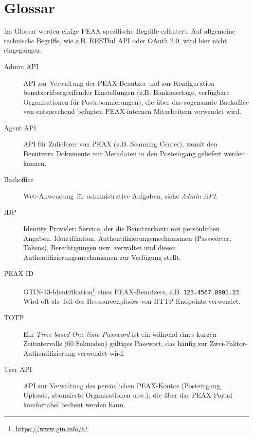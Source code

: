 \section*{Glossar}

Im Glossar werden einige PEAX-spezifische Begriffe erläutert. Auf allgemeine technische Begriffe, wie z.B. RESTful API oder OAuth 2.0, wird hier nicht eingegangen.

\begin{description}
    \item[Admin API] API zur Verwaltung der PEAX-Benutzer und zur Konfiguration benutzerübergreifender Einstellungen (z.B. Bankfeiertage, verfügbare Organisationen für Postabonnierungen), die über das sogenannte Backoffice von entsprechend befugten PEAX-internen Mitarbeitern verwendet wird.
    \item[Agent API] API für Zulieferer von PEAX (z.B. Scanning Center), womit den Benutzern Dokumente mit Metadaten in den Posteingang geliefert werden können.
    \item[Backoffice] Web-Anwendung für administrative Aufgaben, siehe \textit{Admin API}.
    \item[IDP] Identity Provider: Service, der die Benutzerkonti mit persönlichen Angaben, Identifikation, Authentifizierungsmechanismen (Passwörter, Tokens), Berechtigungen usw. verwaltet und diesen Authentifizierungsmechanismen zur Verfügung stellt.
    \item[PEAX ID] GTIN-13-Identifikation\footnote{\url{https://www.gin.info/}} eines PEAX-Benutzers, z.B. \texttt{123.4567.8901.23}. Wird oft als Teil des Ressourcenpfades von HTTP-Endpoints verwendet.
    \item[TOTP] Ein \textit{Time-based One-time Password} ist ein während eines kurzen Zeitintervalls (60 Sekunden) gültiges Passwort, das häufig zur Zwei-Faktor-Authentifizierung verwendet wird.
    \item[User API] API zur Verwaltung des persönlichen PEAX-Kontos (Posteingang, Uploads, abonnierte Organisationen usw.), die über das PEAX-Portal komfortabel bedient werden kann.
\end{description}
